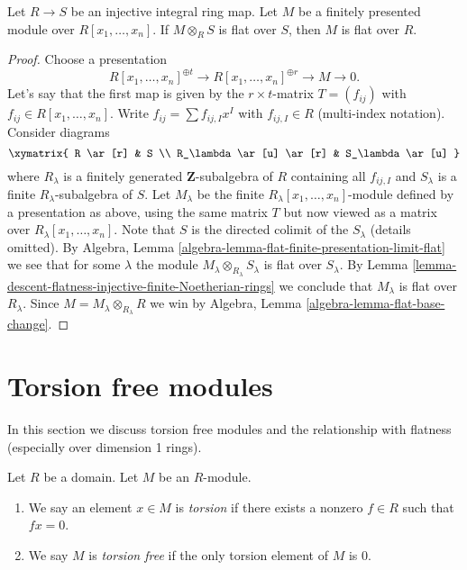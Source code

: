 \begin{lemma}
\label{lemma-descent-flatness-injective-integral}
Let $R \to S$ be an injective integral ring map.
Let $M$ be a finitely presented module over $R[x_1, \ldots, x_n]$.
If $M \otimes_R S$ is flat over $S$, then $M$ is flat over $R$.
\end{lemma}

\begin{proof}
Choose a presentation
$$
R[x_1, \ldots, x_n]^{\oplus t} \to R[x_1, \ldots, x_n]^{\oplus r} \to M \to 0.
$$
Let's say that the first map is given by the $r \times t$-matrix
$T = (f_{ij})$ with $f_{ij} \in R[x_1, \ldots, x_n]$. Write
$f_{ij} = \sum f_{ij, I} x^I$ with $f_{ij, I} \in R$ (multi-index notation).
Consider diagrams
$$
\xymatrix{
R \ar[r] & S \\
R_\lambda \ar[u] \ar[r] & S_\lambda \ar[u]
}
$$
where $R_\lambda$ is a finitely generated $\mathbf{Z}$-subalgebra of
$R$ containing all $f_{ij, I}$ and $S_\lambda$ is a finite
$R_\lambda$-subalgebra of $S$. Let $M_\lambda$ be the finite
$R_\lambda[x_1, \ldots, x_n]$-module defined by a presentation
as above, using the same matrix $T$ but now viewed as a matrix
over $R_\lambda[x_1, \ldots, x_n]$. Note that $S$ is the directed colimit
of the $S_\lambda$ (details omitted). By
Algebra, Lemma \ref{algebra-lemma-flat-finite-presentation-limit-flat}
we see that for some $\lambda$ the module
$M_\lambda \otimes_{R_\lambda} S_\lambda$ is flat over $S_\lambda$. By
Lemma \ref{lemma-descent-flatness-injective-finite-Noetherian-rings}
we conclude that $M_\lambda$ is flat over $R_\lambda$. Since
$M = M_\lambda \otimes_{R_\lambda} R$ we win by
Algebra, Lemma \ref{algebra-lemma-flat-base-change}.
\end{proof}




\section{Torsion free modules}
\label{section-torsion-flat}

\noindent
In this section we discuss torsion free modules and the relationship
with flatness (especially over dimension 1 rings).

\begin{definition}
\label{definition-torsion}
Let $R$ be a domain. Let $M$ be an $R$-module.
\begin{enumerate}
\item We say an element $x \in M$ is {\it torsion} if there exists
a nonzero $f \in R$ such that $fx = 0$.
\item We say $M$ is {\it torsion free} if the only torsion element of $M$
is $0$.
\end{enumerate}
\end{definition}

